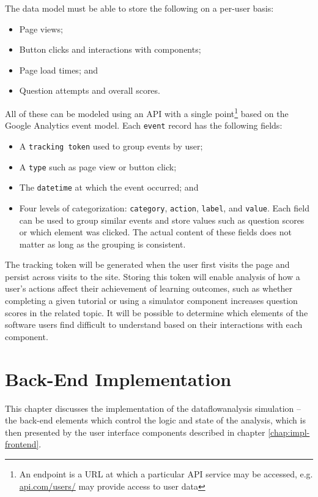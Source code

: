 \documentclass[bsc,twoside,singlespacing,parskip,logo,notimes,normalheadings]{infthesis}
\begin{document}
    The data model must be able to store the following on a per-user
    basis:

    \begin{itemize}
    \item Page views;
    \item Button clicks and interactions with components;
    \item Page load times; and
    \item Question attempts and overall scores.
    \end{itemize}

    All of these can be modeled using an API with a single
point\footnote{An endpoint is a URL at which a particular API
      service may be accessed, e.g. \url{api.com/users/} may provide
      access to user data} based on the Google Analytics event
    model. Each {\tt event} record has the following fields:

    \begin{itemize}
    \item A {\tt tracking token} used to group events by user;
    \item A {\tt type} such as page view or button click;
    \item The {\tt datetime} at which the event occurred; and
    \item Four levels of categorization: {\tt category}, {\tt action},
      {\tt label}, and {\tt value}. Each field can be used to group
      similar events and store values such as question scores or which
      element was clicked. The actual content of these fields does not
      matter as long as the grouping is consistent.
    \end{itemize}

    The tracking token will be generated when the user first visits
    the page and persist across visits to the site. Storing this token
    will enable analysis of how a user's actions affect their
    achievement of learning outcomes, such as whether completing a
    given tutorial or using a simulator component increases question
    scores in the related topic. It will be possible to determine
    which elements of the software users find difficult to understand
    based on their interactions with each component.
    

\chapter{Back-End Implementation}\label{chap:impl-backend}
This chapter discusses the implementation of the
\gls{dataflowanalysis} simulation -- the back-end elements which
control the logic and state of the analysis, which is then presented
by the user interface components described in chapter
\ref{chap:impl-frontend}.
\end{document}
